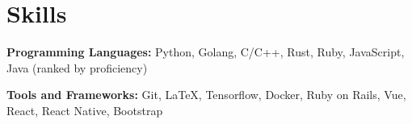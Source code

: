 \documentclass{resume}
\begin{document}

\section{Skills}
\textbf{Programming Languages:} \small Python, Golang, C/C++, Rust, Ruby, JavaScript, Java (ranked by proficiency)

\textbf{Tools and Frameworks:} \small Git, \LaTeX, Tensorflow, Docker, Ruby on Rails, Vue, React, React Native, Bootstrap
\end{document}
